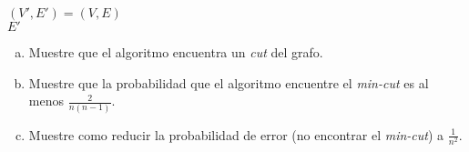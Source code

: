 \documentclass[dcc,uchile]{fcfmcourse}
\theoremstyle{plain}
\theoremstyle{definition}
\begin{document}
\begin{problems}
\begin{algorithm}[H]
        \SetAlgoLined
        $(V',E') = (V,E)$\\
        \Return $E'$
\end{algorithm}
\begin{enumerate}[a)]
\item Muestre que el algoritmo encuentra un \textit{cut} del grafo.
\item Muestre que la probabilidad que el algoritmo encuentre el \textit{min-cut} es al menos $\frac{2}{n(n-1)}$.
\item Muestre como reducir la probabilidad de error (no encontrar el \textit{min-cut}) a $\frac{1}{n^2}$.
\end{enumerate}
\end{problems}
\newpage
\end{document}
